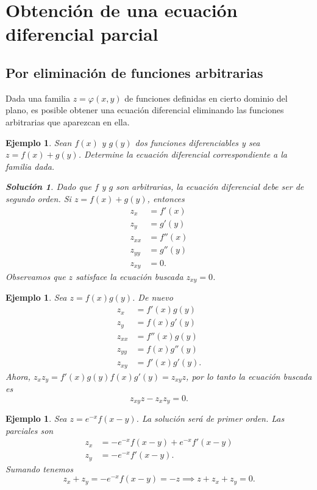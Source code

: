 \documentclass[11pt,letterpaper,draft]{report}
\newtheorem{example}[defn]{Ejemplo}
\newtheorem*{sol}{Solución}
\newcommand\<{\langle}
\renewcommand\>{\rangle}
\renewcommand\phi\varphi
\begin{document}
\section{Obtención de una ecuación diferencial parcial}

\subsection{Por eliminación de funciones arbitrarias}

Dada una familia $z = \phi(x,y)$ de funciones definidas en
cierto dominio del plano, es posible obtener una ecuación
diferencial eliminando las funciones arbitrarias que
aparezcan en ella.

\begin{example}
  Sean $f(x)$ y $g(y)$ dos funciones diferenciables y sea $z
  = f(x) + g(y)$. Determine la ecuación diferencial
  correspondiente a la familia dada.

  \begin{sol}
    Dado que $f$ y $g$ son arbitrarias, la ecuación
    diferencial debe ser de segundo orden. Si $z = f(x) +
    g(y)$, entonces
     \begin{align*}
       z_x &= f'(x)\\
       z_y &= g'(y)\\
       z_{xx} &= f''(x)\\
       z_{yy} &= g''(y)\\
       z_{xy} &= 0.
    \end{align*} Observamos que $z$ satisface la ecuación
    buscada $z_{xy} = 0$.
  \end{sol}
\end{example}

\begin{example}
  Sea $z = f(x)g(y)$. De nuevo
  \begin{align*}
    z_x &= f'(x)g(y)\\
    z_y &= f(x)g'(y)\\
    z_{xx} &= f''(x)g(y)\\
    z_{yy} &= f(x)g''(y)\\
    z_{xy} &= f'(x)g'(y).
  \end{align*}
  Ahora, $z_x z_y = f'(x)g(y)f(x)g'(y) = z_{xy} z$, por lo
  tanto la ecuación buscada es
  \[
    z_{xy} z - z_x z_y = 0.
  \] 
\end{example}

\begin{example}
  Sea $z = e^{-x} f(x-y)$. La solución será de primer orden.
  Las parciales son
  \begin{align*}
    z_x &= -e^{-x} f(x-y) + e^{-x} f'(x-y)\\
    z_y &= -e^{-x} f'(x-y).
  \end{align*} Sumando tenemos
  \[
    z_x + z_y = -e^{-x} f(x-y) = -z \implies z + z_x + z_y =
    0.
  \] 
\end{example}
\end{document}
